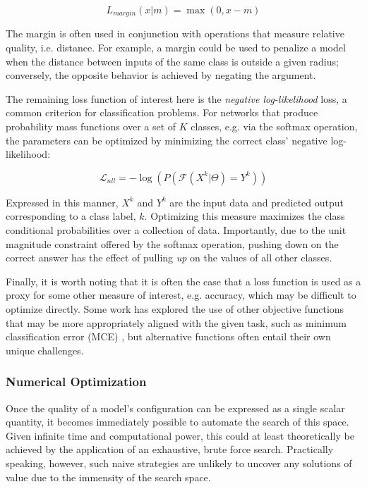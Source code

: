 \begin{equation}
\label{eq:mse}
L_{margin}(x | m) = \max(0, x - m)
\end{equation}

\noindent The margin is often used in conjunction with operations that measure relative quality, i.e. distance.
For example, a margin could be used to penalize a model when the distance between inputs of the same class is outside a given radius;
conversely, the opposite behavior is achieved by negating the argument.

The remaining loss function of interest here is the \emph{negative log-likelihood} loss, a common criterion for classification problems.
For networks that produce probability mass functions over a set of $K$ classes, e.g. via the softmax operation, the parameters can be optimized by minimizing the correct class' negative log-likelihood:

\begin{equation}
\label{eq:nll}
\mathcal{L}_{nll}=-\log(P(\mathcal{F}(X^k |\Theta) = Y^k))
\end{equation}

\noindent Expressed in this manner, $X^k$ and $Y^k$ are the input data and predicted output corresponding to a class label, $k$.
Optimizing this measure maximizes the class conditional probabilities over a collection of data.
Importantly, due to the unit magnitude constraint offered by the softmax operation, pushing down on the correct answer has the effect of pulling \emph{up} on the values of all other classes.

Finally, it is worth noting that it is often the case that a loss function is used as a proxy for some other measure of interest, e.g. accuracy, which may be difficult to optimize directly.
Some work has explored the use of other objective functions that may be more appropriately aligned with the given task, such as minimum classification error (MCE) \cite{Juang1997Minimum}, but alternative functions often entail their own unique challenges.


\subsubsection{Numerical Optimization}
\label{subsubsec:numopt}
Once the quality of a model's configuration can be expressed as a single scalar quantity, it becomes immediately possible to automate the search of this space.
Given infinite time and computational power, this could at least theoretically be achieved by the application of an exhaustive, brute force search.
Practically speaking, however, such naive strategies are unlikely to uncover any solutions of value due to the immensity of the search space.

